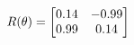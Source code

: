 \documentclass[preview]{standalone}
\begin{document}
\begin{align*}
\special{dvisvgm:raw <g id='unique000'>}R(\theta) = \begin{bmatrix}0.14 & -0.99\\0.99 & 0.14\end{bmatrix}\special{dvisvgm:raw </g>}
\end{align*}
\end{document}

